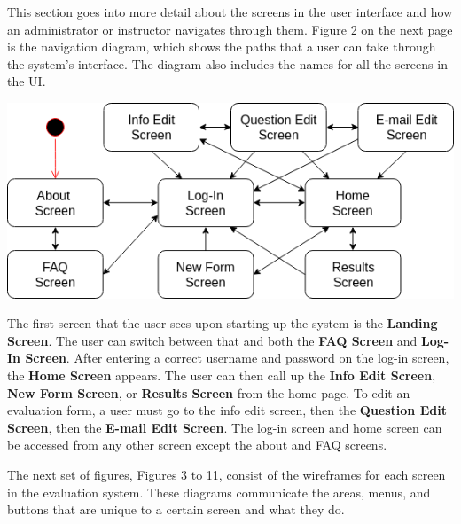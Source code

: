 \documentclass{article}
\begin{document}
This section goes into more detail about the screens in the user interface and how an administrator or instructor navigates through them. Figure 2 on the next page is the navigation diagram, which shows the paths that a user can take through the system's interface. The diagram also includes the names for all the screens in the UI.

\newpage

\begin{center}
\vspace{3mm}
{\includegraphics[scale=0.6]{images/navigation_diagram.png}}
\vspace{2mm}
\end{center}

The first screen that the user sees upon starting up the system is the \textbf{Landing Screen}. The user can switch between that and both the \textbf{FAQ Screen} and  \textbf{Log-In Screen}. After entering a correct username and password on the log-in screen, the \textbf{Home Screen} appears. The user can then call up the \textbf{Info Edit Screen}, \textbf{New Form Screen}, or \textbf{Results Screen} from the home page. To edit an evaluation form, a user must go to the info edit screen, then the \textbf{Question Edit Screen}, then the \textbf{E-mail Edit Screen}. The log-in screen and home screen can be accessed from any other screen except the about and FAQ screens.

The next set of figures, Figures 3 to 11, consist of the wireframes for each screen in the evaluation system. These diagrams communicate the areas, menus, and buttons that are unique to a certain screen and what they do.

\newpage
{}
\end{document}
